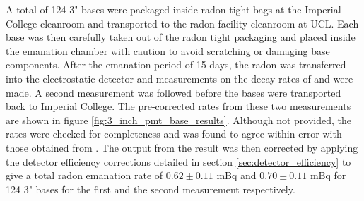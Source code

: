 A total of 124 3" bases were packaged inside radon tight bags at the Imperial College cleanroom and transported to the radon facility cleanroom at UCL. Each base was then carefully taken out of the radon tight packaging and placed inside the emanation chamber with caution to avoid scratching or damaging base components. After the emanation period of 15 days, the radon was transferred into the electrostatic detector and measurements on the decay rates of \PoTOF{} and \PoTOE{} were made. A second measurement was followed before the bases were transported back to Imperial College. The pre-corrected \PoTOF{} rates from these two measurements are shown in figure \ref{fig:3_inch_pmt_base_results}. Although not provided, the \PoTOE{} rates were checked for completeness and was found to agree within error with those obtained from \PoTOF{}. The output from the \PoTOF{} result was then corrected by applying the detector efficiency corrections detailed in section \ref{sec:detector_efficiency} to give a total radon emanation rate of $0.62\pm0.11$ mBq and $0.70\pm0.11$ mBq for 124 3" bases for the first and the second measurement respectively. 
%
